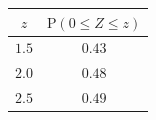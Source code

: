 {\setlength{\tabcolsep}{4pt}\renewcommand{\arraystretch}{1.3}\small%
\begin{tabular}{|c|c|}
\hline
$z$ & $\mathrm{P}(0\le Z\le z)$ \\
\hline
$1.5$ & $0.43$ \\
\hline
$2.0$ & $0.48$ \\
\hline
$2.5$ & $0.49$ \\
\hline
\end{tabular}}

